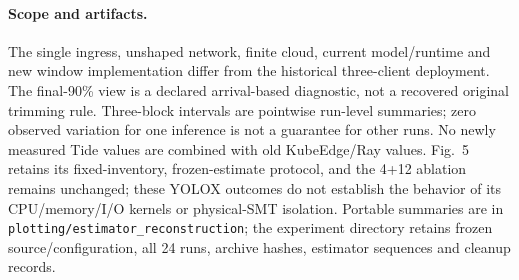 \paragraph{Scope and artifacts.}
The single ingress, unshaped network, finite cloud, current model/runtime and new window implementation differ from the historical three-client deployment. The final-90\% view is a declared arrival-based diagnostic, not a recovered original trimming rule. Three-block intervals are pointwise run-level summaries; zero observed variation for one inference is not a guarantee for other runs. No newly measured Tide values are combined with old KubeEdge/Ray values. Fig.~5 retains its fixed-inventory, frozen-estimate protocol, and the 4+12 ablation remains unchanged; these YOLOX outcomes do not establish the behavior of its CPU/memory/I/O kernels or physical-SMT isolation. Portable summaries are in \texttt{plotting/estimator\_reconstruction}; the experiment directory retains frozen source/configuration, all 24 runs, archive hashes, estimator sequences and cleanup records.
